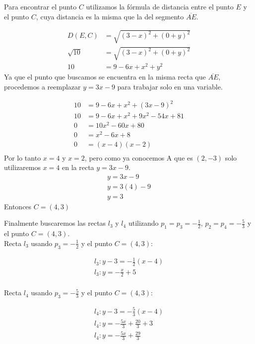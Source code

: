 \documentclass[a4paper,10pt]{article}
\begin{document}
\begin{enumerate}
Para encontrar el punto $C$ utilizamos la fórmula de distancia entre el punto $E$ y el punto $C$, cuya distancia es la misma que la del segmento $\overline{AE}$.

\begin{align*}
D(E,C) &= \sqrt{(3-x)^2+(0+y)^2}\\
\sqrt{10} &= \sqrt{(3-x)^2+(0+y)^2}\\
10 &= 9 - 6x + x^2 + y^2
\end{align*}
Ya que el punto que buscamos se encuentra en la misma recta que $\overline{AE}$, procedemos a reemplazar $y=3x-9$ para trabajar solo en una variable.

\begin{align*}
10 &= 9 - 6x + x^2 + (3x-9)^2\\
10 &= 9 - 6x + x^2 + 9x^2 - 54x + 81\\
0  &= 10x^2  - 60x + 80\\
0  &= x^2  - 6x + 8\\
0  &= (x-4)(x-2)\\
\end{align*}
Por lo tanto $x= 4$ y $x = 2$, pero como ya conocemos A que es $(2,-3)$ solo utilizaremos $x=4$ en la recta $y=3x-9$.
 \begin{gather*}
y=3x-9\\
y= 3(4)-9\\
y= 3
\end{gather*}
Entonces $C=(4,3)$

\vspace{5mm}

Finalmente buscaremos las rectas $l_3$ y $l_4$ utilizando $p_1=p_3=-\frac{1}{2}$, $p_2=p_4=-\frac{5}{3}$ y el punto $C=(4,3)$.\\

Recta $l_3$ usando $p_3=-\frac{1}{2}$ y el punto $C=(4,3)$:

 \begin{gather*}
l_3: y-3 = -\frac{1}{2} (x-4)\\
l_3: y= -\frac{x}{2} +5\\
\end{gather*}

Recta $l_4$ usando $p_3=-\frac{5}{3}$ y el punto $C=(4,3)$:

 \begin{gather*}
l_4: y-3 = -\frac{5}{3} (x-4)\\
l_4: y= -\frac{5x}{3} +\frac{20}{3}+3\\
l_4: y= -\frac{5x}{3} +\frac{29}{3}
\end{gather*}


\end{enumerate}
\end{document}
